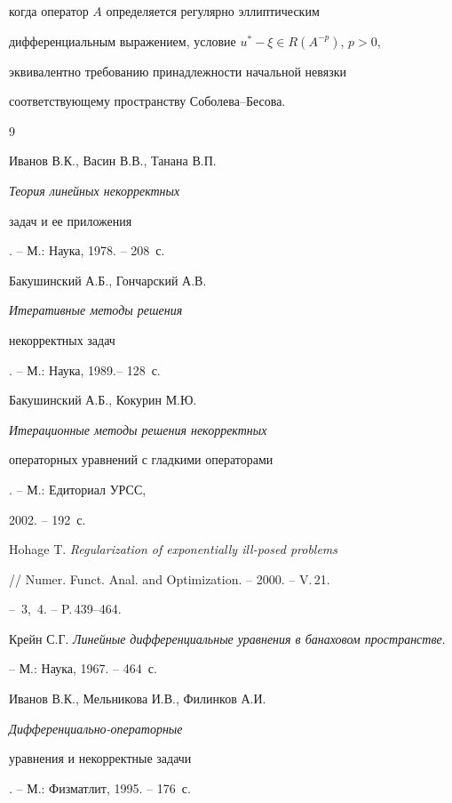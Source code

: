 когда оператор $A$ определяется регулярно эллиптическим


дифференциальным выражением, условие $u^* - \xi \in R(A^{-p})$, $p>0$, 


эквивалентно требованию принадлежности начальной невязки 


соответствующему пространству Соболева--Бесова. 








\begin{thebibliography}{9}







Иванов В.К., Васин В.В., Танана В.П. {\em Теория линейных некорректных 


задач и ее приложения}. -- М.: Наука, 1978. -- 208~с.




Бакушинский А.Б., Гончарский А.В. {\em Итеративные методы решения 


некорректных задач}. -- М.: Наука, 1989.-- 128~с. 




Бакушинский А.Б., Кокурин М.Ю. {\em Итерационные методы решения некорректных 


операторных уравнений с гладкими операторами}. -- М.: Едиториал УРСС, 


2002. -- 192~с.




Hohage T. {\em Regularization of exponentially ill-posed problems}


// Numer. Funct. Anal. and Optimization. -- 2000. -- V.\,21.


-- \No\No\,3,~4. -- P.\,439--464.




Крейн С.Г. {\em Линейные дифференциальные уравнения в банаховом пространстве}.


-- М.: Наука, 1967. -- 464~с.




Иванов В.К., Мельникова И.В., Филинков А.И. {\em Дифференциально-операторные


уравнения и некорректные задачи}. -- М.: Физматлит, 1995. -- 176~с.





\end{thebibliography}





\vskip 1cm












\label{end}





